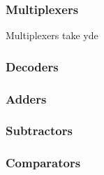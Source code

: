 \documentclass[12pt]{article}
\theoremstyle{definition}
\begin{document}
\subsubsection{Multiplexers}
Multiplexers take yde
\subsubsection{Decoders}
\subsubsection{Adders}
\subsubsection{Subtractors}
\subsubsection{Comparators}
\end{document}
